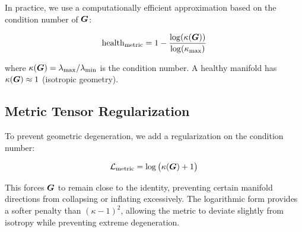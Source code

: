 In practice, we use a computationally efficient approximation based on
the condition number of $\bm{G}$:

\begin{equation}
    \text{health}_{\text{metric}} = 1 - \frac{\log(\kappa(\bm{G}))}{\log(\kappa_{\max})}
\end{equation}

where $\kappa(\bm{G}) = \lambda_{\max} / \lambda_{\min}$ is the condition
number. A healthy manifold has $\kappa(\bm{G}) \approx 1$ (isotropic
geometry).

\subsection{Metric Tensor Regularization}

To prevent geometric degeneration, we add a regularization on the
condition number:

\begin{equation}
    \mathcal{L}_{\text{metric}} = \log\big(\kappa(\bm{G}) + 1\big)
\end{equation}

This forces $\bm{G}$ to remain close to the identity, preventing certain
manifold directions from collapsing or inflating excessively.
The logarithmic form provides a softer penalty than $(\kappa - 1)^2$,
allowing the metric to deviate slightly from isotropy while preventing
extreme degeneration.
